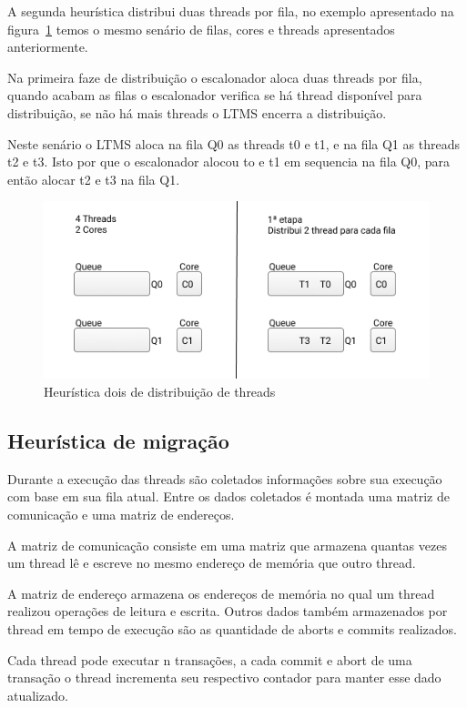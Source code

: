 \documentclass[diss,capa]{texufpel}
\begin{document}
A segunda heurística distribui duas threads por fila, no exemplo apresentado na figura~\ref{queue_two} temos o mesmo senário de filas, cores e threads apresentados anteriormente.

Na primeira faze de distribuição o escalonador aloca duas threads por fila, quando acabam as filas o escalonador verifica se há thread disponível para distribuição, se não há mais threads o LTMS encerra a distribuição.

Neste senário o LTMS aloca na fila Q0 as threads t0 e t1, e na fila Q1 as threads t2 e t3. Isto por que o escalonador alocou to e t1 em sequencia na fila Q0, para então alocar t2 e t3 na fila Q1.

\begin{figure}[htbp]
  \centering
  \includegraphics[scale=.8]{images/Queue_two.png}
\caption{Heurística dois de distribuição de threads}
\label{queue_two}
\end{figure}


\subsection{Heurística de migração}
\label{migration_heuristic}

Durante a execução das threads são coletados informações sobre sua execução com base em sua fila atual. Entre os dados coletados é montada uma matriz de comunicação e uma matriz de endereços.

A matriz de comunicação consiste em uma matriz que armazena quantas vezes um thread lê e escreve no mesmo endereço de memória que outro thread.

A matriz de endereço armazena os endereços de memória no qual um thread realizou operações de leitura e escrita. Outros dados também armazenados por thread em tempo de execução são as quantidade de aborts e commits realizados.

Cada thread pode executar n transações, a cada commit e abort de uma transação o thread incrementa seu respectivo contador para manter esse dado atualizado.
\end{document}
